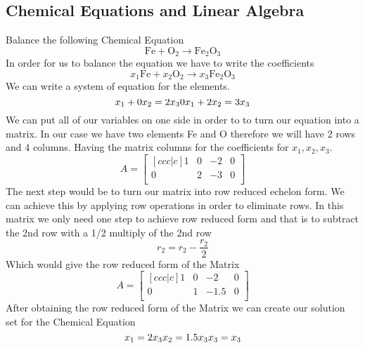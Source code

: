 \documentclass[12pt]{article}
\begin{document}
\subsection{Chemical Equations and Linear Algebra}
Balance the following Chemical Equation
\begin{equation*}
\text{Fe}+\text{O}_2 \rightarrow \text{Fe}_2\text{O}_3
\end{equation*}
In order for us to balance the equation we have to write the coefficients
\begin{equation*}
x_1\text{Fe}+x_2\text{O}_2 \rightarrow x_3\text{Fe}_2\text{O}_3
\end{equation*}
We can write a system of equation for the elements.
\begin{equation*}
x_1+0x_2=2x_3 \\
0x_1+2x_2=3x_3
\end{equation*} 
We can put all of our variables on one side in order to to turn our equation into a matrix. In our case we have two elements Fe and O therefore we will have 2 rows and 4 columns.  Having the matrix columns for the coefficients for $x_1, x_2, x_3$.
\begin{equation*}
A = \begin{bmatrix}[ccc|c]
1 & 0 & -2 & 0\\
0 & 2 & -3 & 0\\
\end{bmatrix}
\end{equation*}
The next step would be to turn our matrix into row reduced echelon form. We can achieve this by applying row operations in order to eliminate rows.
In this matrix we only need one step to achieve row reduced form and that is to subtract the 2nd row with a 1/2 multiply of the 2nd row
\begin{equation*}
r_{2} = r_2 - \frac{r_{2}}{2}
\end{equation*}
Which would give the row reduced form of the Matrix
\begin{equation*}
  A = \begin{bmatrix}[ccc|c]
  1 & 0 & -2 & 0\\
  0 & 1 & -1.5 & 0\\
  \end{bmatrix}
  \end{equation*}
 After obtaining the row reduced form of the Matrix we can create our solution set for the Chemical Equation
 \begin{equation*}
 x_1 = 2x_3 \\
 x_2 = 1.5x_3 \\
 x_3 = x_3
 \end{equation*}
\end{document}
